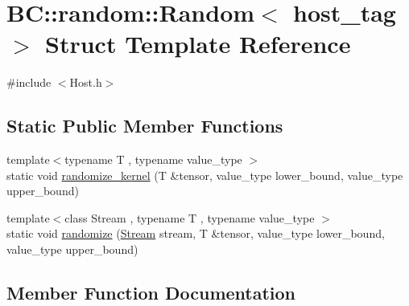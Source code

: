 \hypertarget{structBC_1_1random_1_1Random_3_01host__tag_01_4}{}\section{BC\+:\+:random\+:\+:Random$<$ host\+\_\+tag $>$ Struct Template Reference}
\label{structBC_1_1random_1_1Random_3_01host__tag_01_4}


{\ttfamily \#include $<$Host.\+h$>$}

\subsection*{Static Public Member Functions}
\begin{DoxyCompactItemize}
\item 
{\footnotesize template$<$typename T , typename value\+\_\+type $>$ }\\static void \hyperlink{structBC_1_1random_1_1Random_3_01host__tag_01_4_a58ad10214b1c66556a37ebf8bb15aa89}{randomize\+\_\+kernel} (T \&tensor, value\+\_\+type lower\+\_\+bound, value\+\_\+type upper\+\_\+bound)
\item 
{\footnotesize template$<$class Stream , typename T , typename value\+\_\+type $>$ }\\static void \hyperlink{structBC_1_1random_1_1Random_3_01host__tag_01_4_a1b28ed4b3cd00ac31b1869c991bd41f7}{randomize} (\hyperlink{namespaceBC_abc64a63cd29a22d102a68f478dfd588d}{Stream} stream, T \&tensor, value\+\_\+type lower\+\_\+bound, value\+\_\+type upper\+\_\+bound)
\end{DoxyCompactItemize}


\subsection{Member Function Documentation}
